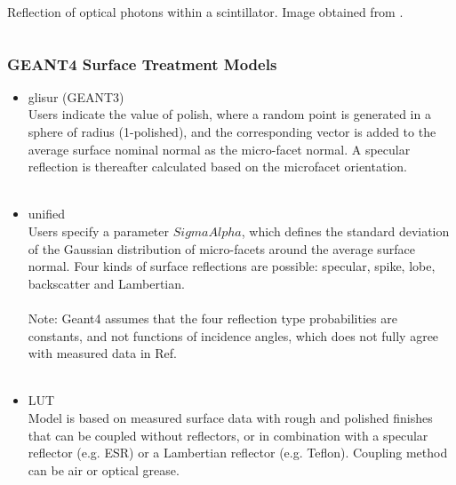 \documentclass[xcolor=x11names, compress, handout]{beamer}
\renewcommand{\(}{\begin{columns}}
\renewcommand{\)}{\end{columns}}
\newcommand{\<}[1]{\begin{column}{#1}}
\renewcommand{\>}{\end{column}}
\begin{document}
\begin{frame}
\begin{columns}
\begin{column}{0.3\textwidth}
\begin{center}
  \scriptsize Reflection of optical photons within a scintillator. Image obtained from \cite{roncali_cherry_2013}.
  \end{center}
  \end{column}
  \end{columns}

\end{frame}

\begin{frame}
\frametitle{GEANT4 Surface Treatment Models  }
\scriptsize 
\begin{itemize}
\item glisur (GEANT3) \\
Users indicate the value of polish, where a random point is generated in a sphere of radius (1-polished), and the corresponding vector is added to the average surface nominal normal as the micro-facet normal. A specular reflection is thereafter calculated based on the microfacet orientation. \cite{geant4_doc} \cite{janecek_moses_2010} \\
\ \\

\item unified \\
 Users specify a parameter $SigmaAlpha$, which defines the standard deviation of the Gaussian distribution of micro-facets around the average surface normal. \cite{geant4_doc} Four kinds of surface reflections are possible: specular, spike, lobe, backscatter and Lambertian. \cite{janecek_moses_2010} \\
 \ \\

 Note: Geant4 assumes that the four reflection type probabilities are constants, and not functions of incidence angles, which does not fully agree with measured data in Ref. \cite{janecek_moses_2010} \\
 \ \\

\item LUT \\
Model is based on measured surface data with rough and polished finishes that can be coupled without reflectors, or in combination with a specular reflector (e.g. ESR) or a Lambertian reflector (e.g. Teflon). Coupling method can be air or optical grease. \cite{geant4_doc}
\end{itemize}
\end{frame}
\end{document}
